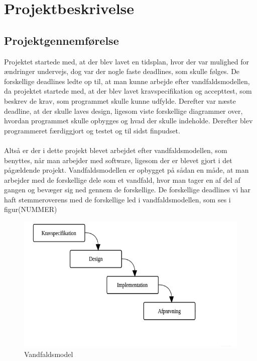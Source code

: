 \chapter{Projektbeskrivelse}

\section{Projektgennemførelse}
Projektet startede med, at der blev lavet en tidsplan, hvor der var mulighed for ændringer undervejs, dog var der nogle faste deadlines, som skulle følges. De forskellige deadlines ledte op til, at man kunne arbejde efter vandfaldsmodellen, da projektet startede med, at der blev lavet kravspecifikation og accepttest, som beskrev de krav, som programmet skulle kunne udfylde. Derefter var næste deadline, at der skulle laves design, ligesom viste forskellige diagrammer over, hvordan programmet skulle opbygges og hvad der skulle indeholde. Derefter blev programmeret færdiggjort og testet og til sidst finpudset. \\ \\
Altså er der i dette projekt blevet arbejdet efter vandfaldsmodellen, som benyttes, når man arbejder med software, ligesom der er blevet gjort i det pågældende projekt. Vandfaldsmodellen er opbygget på sådan en måde, at man arbejder med de forskellige dele som et vandfald, hvor man tager en af del af gangen og bevæger sig ned gennem de forskellige. De forskellige deadlines vi har haft stemmeroverens med de forskellige led i vandfaldsmodellen, som ses i figur(NUMMER)

\begin{figure}[H]
	\centering
	\includegraphics[width=1\textwidth]{Figurer/Snip20150522_15}
	\caption{Vandfaldsmodel}
\end{figure}

